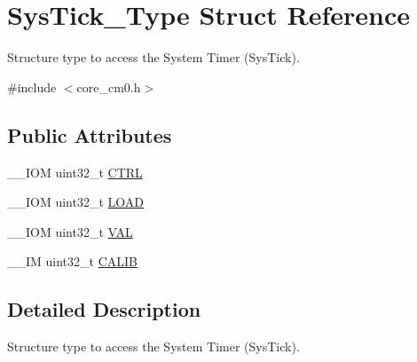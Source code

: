 \hypertarget{struct_sys_tick___type}{\section{Sys\-Tick\-\_\-\-Type Struct Reference}
\label{struct_sys_tick___type}
}


Structure type to access the System Timer (Sys\-Tick).  




{\ttfamily \#include $<$core\-\_\-cm0.\-h$>$}

\subsection*{Public Attributes}
\begin{DoxyCompactItemize}
\item 
\-\_\-\-\_\-\-I\-O\-M uint32\-\_\-t \hyperlink{struct_sys_tick___type_a875e7afa5c4fd43997fb544a4ac6e37e}{C\-T\-R\-L}
\item 
\-\_\-\-\_\-\-I\-O\-M uint32\-\_\-t \hyperlink{struct_sys_tick___type_a4780a489256bb9f54d0ba8ed4de191cd}{L\-O\-A\-D}
\item 
\-\_\-\-\_\-\-I\-O\-M uint32\-\_\-t \hyperlink{struct_sys_tick___type_a9b5420d17e8e43104ddd4ae5a610af93}{V\-A\-L}
\item 
\-\_\-\-\_\-\-I\-M uint32\-\_\-t \hyperlink{struct_sys_tick___type_afcadb0c6d35b21cdc0018658a13942de}{C\-A\-L\-I\-B}
\end{DoxyCompactItemize}


\subsection{Detailed Description}
Structure type to access the System Timer (Sys\-Tick). 

